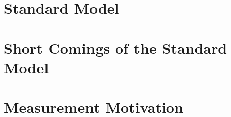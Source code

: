 \label{sec:theory}
\section{Standard Model}
\label{sec:SM}


\section{ Short Comings of the Standard Model}	
\label{sec:SM_Incomplete}

	
\section{ Measurement Motivation}	
\label{sec:Motivation}

